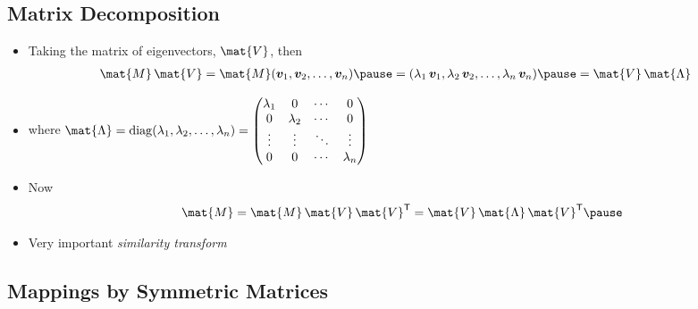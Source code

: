 \begin{slide}
\section[-2]{Matrix Decomposition}

\begin{PauseHighLight}
  \begin{itemize}
  \item Taking the matrix of eigenvectors, $\mat{V}$, then
    \begin{align*}
      \mat{M}\, \mat{V}  &= \mat{M} (\bm{v}_1,\bm{v}_2,\ldots,\bm{v}_n)\pause
      =
      (\lambda_1\,\bm{v}_1,\lambda_2\,\bm{v}_2,\ldots,\lambda_n\,\bm{v}_n)\pause
      = \mat{V} \,\mat{\Lambda}
    \end{align*}
  \item where $\mat{\Lambda} = \mathrm{diag}(\lambda_1,
    \lambda_2,\ldots, \lambda_n) =
    \begin{pmatrix}
      \lambda_1 & 0 & \cdots & 0 \\
      0 & \lambda_2  & \cdots & 0 \\
      \vdots & \vdots &\ddots &\vdots \\
      0 & 0 & \cdots & \lambda_n
    \end{pmatrix}$\pause
  \item Now
    \begin{align*}
      \mat{M} = \mat{M}\, \mat{V} \, \mat{V}^\tr = \mat{V}
      \,\mat{\Lambda} \, \mat{V}^\tr \pause
    \end{align*}
  \item Very important \textit{similarity transform}\pause
  \end{itemize}
\end{PauseHighLight}

\end{slide}



\begin{slide}
\section[-2]{Mappings by Symmetric Matrices}

\pb \pause{}
\begin{center}
  \pause
\end{center}
\end{slide}


